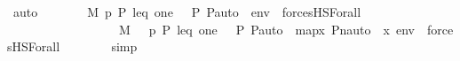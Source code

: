 \begin{isabellebody}
\ auto\isanewline
\ \ \ \ \isamarkupfalse%
\ \isamarkupfalse%
\ {\isachardoublequoteopen}M{\isacharcomma}{\kern0pt}\ {\isacharbrackleft}{\kern0pt}p{\isacharcomma}{\kern0pt}\ P{\isacharcomma}{\kern0pt}\ leq{\isacharcomma}{\kern0pt}\ one{\isacharcomma}{\kern0pt}\ {\isasymlangle}{\isasymF}{\isacharcomma}{\kern0pt}\ {\isasymG}{\isacharcomma}{\kern0pt}\ P{\isacharcomma}{\kern0pt}\ P{\isacharunderscore}{\kern0pt}auto{\isasymrangle}{\isacharbrackright}{\kern0pt}\ {\isacharat}{\kern0pt}\ env\ {\isasymTurnstile}\ forcesHS{\isacharparenleft}{\kern0pt}Forall{\isacharparenleft}{\kern0pt}{\isasymphi}{\isacharparenright}{\kern0pt}{\isacharparenright}{\kern0pt}\ {\isasymlongleftrightarrow}\isanewline
\ \ \ \ \ \ \ \ \ \ \ \ \ \ \ \ \ \ M{\isacharcomma}{\kern0pt}\ {\isacharbrackleft}{\kern0pt}{\isasympi}\ {\isacharbackquote}{\kern0pt}\ p{\isacharcomma}{\kern0pt}\ P{\isacharcomma}{\kern0pt}\ leq{\isacharcomma}{\kern0pt}\ one{\isacharcomma}{\kern0pt}\ {\isasymlangle}{\isasymF}{\isacharcomma}{\kern0pt}\ {\isasymG}{\isacharcomma}{\kern0pt}\ P{\isacharcomma}{\kern0pt}\ P{\isacharunderscore}{\kern0pt}auto{\isasymrangle}{\isacharbrackright}{\kern0pt}\ {\isacharat}{\kern0pt}\ map{\isacharparenleft}{\kern0pt}{\isasymlambda}x{\isachardot}{\kern0pt}\ Pn{\isacharunderscore}{\kern0pt}auto{\isacharparenleft}{\kern0pt}{\isasympi}{\isacharparenright}{\kern0pt}\ {\isacharbackquote}{\kern0pt}\ x{\isacharcomma}{\kern0pt}\ env{\isacharparenright}{\kern0pt}\ {\isasymTurnstile}\ forcesHS{\isacharparenleft}{\kern0pt}Forall{\isacharparenleft}{\kern0pt}{\isasymphi}{\isacharparenright}{\kern0pt}{\isacharparenright}{\kern0pt}{\isachardoublequoteclose}\isanewline
\ \ \ \ \ \ \isamarkupfalse%
\ simp\isanewline
\ \ \isamarkupfalse%
\isanewline
{}\isamarkupfalse%
%
\endisatagproof
{\isafoldproof}%
%
\isadelimproof
\ \isanewline
%
\endisadelimproof
\isanewline
{}\isamarkupfalse%
\isanewline
%
\isadelimtheory
%
\endisadelimtheory
%
\isatagtheory
{}\isamarkupfalse%
%
\endisatagtheory
{\isafoldtheory}%
%
\isadelimtheory
%
\endisadelimtheory
%
\end{isabellebody}%
\endinput
